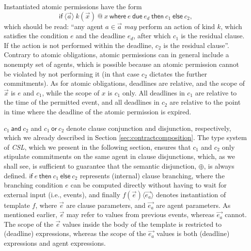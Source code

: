 \documentclass[orivec,final]{llncs-href}
\makeatletter
\newcommand{\csl}{\textit{CSL}}
\newcommand{\catomicp}[7]{\mathsf{if}\ \langle#1\rangle\ #2\ \textsf{@}\ #3\
  \mathsf{where}\ #4\ \mathsf{due}\ #5\ \mathsf{then}\ #6\
  \mathsf{else}\ #7}
\newcommand{\cand}[2]{#1\ \mathsf{and}\ #2}
\newcommand{\cor}[2]{#1\ \mathsf{or}\ #2}
\newcommand{\cifthenelse}[3]{\mathsf{if}\ #1\ \mathsf{then}\ #2\
  \mathsf{else}\ #3}
\newcommand{\cinstantiate}[3]{#1(#2)\langle#3\rangle}
\newcommand{\canddefault}{\cand{c_1}{c_2}}
\newcommand{\cordefault}{\cor{c_1}{c_2}}
\newcommand{\cifthenelsedefault}{\cifthenelse{e}{c_1}{c_2}}
\newcommand{\cinstantiatedefault}{\cinstantiate{f}{\vec{e}}{\vec{e_a}}}
\makeatother
\begin{document}
Instantiated atomic permissions have the form
\[
\catomicp{\vec{a}}{k(\vec{x})}{x}{e}{e_d}{c_1}{c_2},
\]
which should be read: ``any agent $a \in \vec{a}$ \emph{may} perform
an action of kind $k$, which satisfies the condition $e$ and 
the deadline $e_d$, after which $c_1$ is the residual clause. If the
action is not performed within the deadline, $c_2$ is the residual
clause''. Contrary to atomic obligations, atomic permissions can in
general include a nonempty set of agents, which is possible because
an atomic permission cannot be violated by not performing it (in that
case $c_2$ dictates the further commitments). As for atomic
obligations, deadlines are relative, and the scope of $\vec{x}$ is $e$
and $c_1$, while the scope of $x$ is $c_1$ only. All deadlines in $c_1$ are 
relative to the time of the permitted event, and all deadlines in
$c_2$ are relative to the point in time where the deadline of the atomic
permission is expired.

$\canddefault$ and $\cordefault$ denote clause conjunction
and disjunction, respectively, which we already described in Section
\ref{sec:contractcomposition}. The type system of \csl{}, which
we present in the following section, ensures that $c_1$ and $c_2$ only
stipulate commitments on the same agent in clause disjunctions,
which, as we shall see, is sufficient to guarantee that the semantic
disjunction, $\oplus$, is always defined. $\cifthenelsedefault$ represents
(internal) clause branching, where 
the branching condition $e$ can be computed directly without
having to wait for external input (i.e., events), and finally
$\cinstantiatedefault$ denotes instantiation of template $f$,
where $\vec{e}$ are clause parameters, and $\vec{e_a}$ 
are agent parameters. As mentioned earlier, $\vec{e}$ may refer to
values from previous events, whereas $\vec{e_a}$ cannot. The scope of
the $\vec{e}$ values inside the body of the template is restricted to
(deadline) expressions, whereas the scope of the $\vec{e_a}$ values is
both (deadline) expressions and agent expressions.
\end{document}
